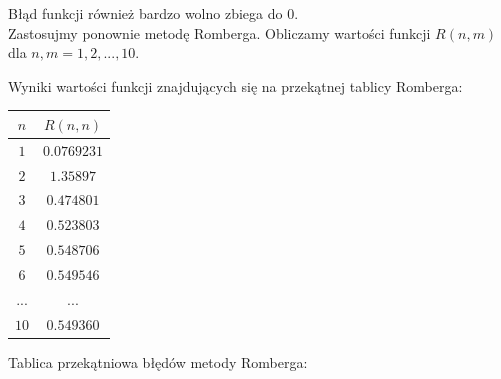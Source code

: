 \documentclass[12p]{article}
\begin{document}
Błąd funkcji również bardzo wolno zbiega do 0.\\

Zastosujmy ponownie metodę Romberga. Obliczamy wartości funkcji $ R(n,m) $ dla $n,m = 1,2,...,10$.

Wyniki wartości funkcji znajdujących się na przekątnej tablicy Romberga:

\begin{table}[h]
\centering
\begin{tabular}{|c|c|}
    \hline
\large $n$   & $R(n,n)$   
    \normalsize\\
    \hline
    $1$      & $0.0769231$ \\ \hline
    $2$      &   $1.35897$ \\ \hline
    $3$      &  $0.474801$\\ \hline
    $4$      &  $0.523803$ \\ \hline
    $5$      &  $0.548706$\\ \hline
    $6$      &  $0.549546$ \\ \hline
    $... $      &  $...$ \\ \hline
    $10 $      &  $0.549360$ \\ \hline

    


\end{tabular}
\end{table}

Tablica przekątniowa błędów metody Romberga:
\end{document}
